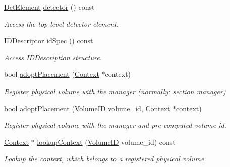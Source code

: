 \begin{DoxyCompactItemize}
\hyperlink{class_d_d4hep_1_1_geometry_1_1_det_element}{Det\+Element} \hyperlink{class_d_d4hep_1_1_geometry_1_1_volume_manager_a0da5e3f504392edecef3b1f1f3c7b111}{detector} () const
\begin{DoxyCompactList}\small\item\em Access the top level detector element. \end{DoxyCompactList}\item 
\hyperlink{class_d_d4hep_1_1_geometry_1_1_i_d_descriptor}{I\+D\+Descriptor} \hyperlink{class_d_d4hep_1_1_geometry_1_1_volume_manager_aa114fa9663579ed3ca0f5d59ae8d32db}{id\+Spec} () const
\begin{DoxyCompactList}\small\item\em Access I\+D\+Description structure. \end{DoxyCompactList}\item 
bool \hyperlink{class_d_d4hep_1_1_geometry_1_1_volume_manager_acfeddaf04beb69692702c453a9ad9933}{adopt\+Placement} (\hyperlink{class_d_d4hep_1_1_geometry_1_1_volume_manager_adadb14f2ccbeaad001b7bc6ddb6dc715}{Context} $\ast$context)
\begin{DoxyCompactList}\small\item\em Register physical volume with the manager (normally\+: section manager) \end{DoxyCompactList}\item 
bool \hyperlink{class_d_d4hep_1_1_geometry_1_1_volume_manager_ac7ad07c472812b32144b3c2a8b4475b2}{adopt\+Placement} (\hyperlink{class_d_d4hep_1_1_geometry_1_1_volume_manager_ab1f746b561c93be38bc7c6e66fc8ca8a}{Volume\+ID} volume\+\_\+id, \hyperlink{class_d_d4hep_1_1_geometry_1_1_volume_manager_adadb14f2ccbeaad001b7bc6ddb6dc715}{Context} $\ast$context)
\begin{DoxyCompactList}\small\item\em Register physical volume with the manager and pre-\/computed volume id. \end{DoxyCompactList}\item 
\hyperlink{class_d_d4hep_1_1_geometry_1_1_volume_manager_adadb14f2ccbeaad001b7bc6ddb6dc715}{Context} $\ast$ \hyperlink{class_d_d4hep_1_1_geometry_1_1_volume_manager_ac6e159608642efd4a62d81f793a01263}{lookup\+Context} (\hyperlink{class_d_d4hep_1_1_geometry_1_1_volume_manager_ab1f746b561c93be38bc7c6e66fc8ca8a}{Volume\+ID} volume\+\_\+id) const
\begin{DoxyCompactList}\small\item\em Lookup the context, which belongs to a registered physical volume. \end{DoxyCompactList}\item 

\end{DoxyCompactItemize}
